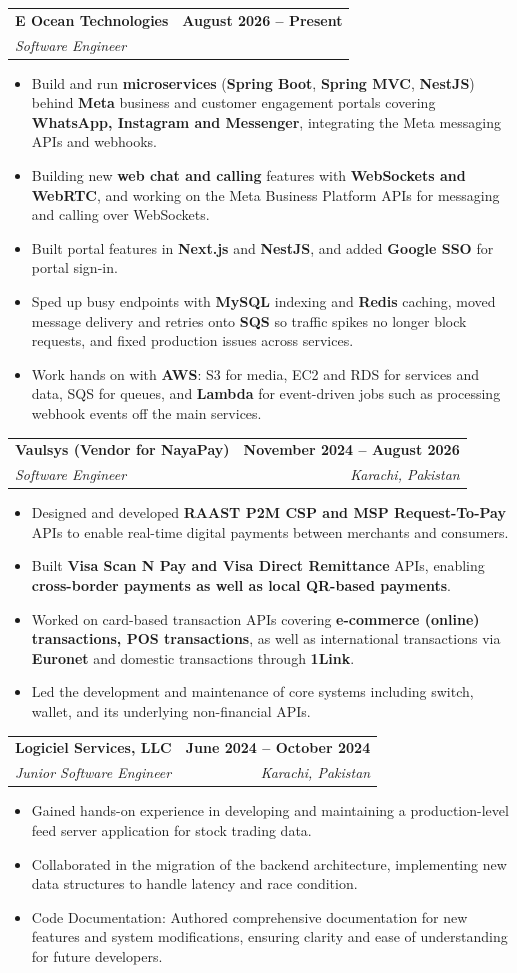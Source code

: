 \documentclass[letterpaper,10pt]{article}
\makeatletter
\newcommand{\resumeItem}[1]{\item\small{#1 \vspace{-2pt}}}
\newcommand{\resumeSubheading}[4]{
  \vspace{-1pt}\item
    \begin{tabular*}{0.97\textwidth}[t]{l@{\extracolsep{\fill}}r}
      \textbf{#1} & \textbf{\small #2} \\
      \textit{\small#3} & \textit{\small #4} \\
    \end{tabular*}\vspace{-5pt}
}
\newcommand{\resumeItemListStart}{\begin{itemize}}
\newcommand{\resumeItemListEnd}{\end{itemize}\vspace{-5pt}}
\makeatother
\begin{document}
    \resumeSubheading
      {E Ocean Technologies}{August 2026 -- Present}
      {Software Engineer}{}
      \resumeItemListStart
        \resumeItem{Build and run \textbf{microservices} (\textbf{Spring Boot}, \textbf{Spring MVC}, \textbf{NestJS}) behind \textbf{Meta} business and customer engagement portals covering \textbf{WhatsApp, Instagram and Messenger}, integrating the Meta messaging APIs and webhooks.}
        \resumeItem{Building new \textbf{web chat and calling} features with \textbf{WebSockets and WebRTC}, and working on the Meta Business Platform APIs for messaging and calling over WebSockets.}
        \resumeItem{Built portal features in \textbf{Next.js} and \textbf{NestJS}, and added \textbf{Google SSO} for portal sign-in.}
        \resumeItem{Sped up busy endpoints with \textbf{MySQL} indexing and \textbf{Redis} caching, moved message delivery and retries onto \textbf{SQS} so traffic spikes no longer block requests, and fixed production issues across services.}
        \resumeItem{Work hands on with \textbf{AWS}: S3 for media, EC2 and RDS for services and data, SQS for queues, and \textbf{Lambda} for event-driven jobs such as processing webhook events off the main services.}
      \resumeItemListEnd

    \resumeSubheading
      {Vaulsys (Vendor for NayaPay)}{November 2024 -- August 2026}
      {Software Engineer}{Karachi, Pakistan}
      \resumeItemListStart
        \resumeItem{Designed and developed \textbf{RAAST P2M CSP and MSP Request-To-Pay} APIs to enable real-time digital payments between merchants and consumers.}
        \resumeItem{Built \textbf{Visa Scan N Pay and Visa Direct Remittance} APIs, enabling \textbf{cross-border payments as well as local QR-based payments}.}
        \resumeItem{Worked on card-based transaction APIs covering \textbf{e-commerce (online) transactions, POS transactions}, as well as international transactions via \textbf{Euronet} and domestic transactions through \textbf{1Link}.}
        \resumeItem{Led the development and maintenance of core systems including switch, wallet, and its underlying non-financial APIs.}
      \resumeItemListEnd

    \resumeSubheading
      {Logiciel Services, LLC}{June 2024 -- October 2024}
      {Junior Software Engineer}{Karachi, Pakistan}
      \resumeItemListStart
        \resumeItem{Gained hands-on experience in developing and maintaining a production-level feed server application for stock trading data.}
        \resumeItem{Collaborated in the migration of the backend architecture, implementing new data structures to handle latency and race condition.}
        \resumeItem{Code Documentation: Authored comprehensive documentation for new features and system modifications, ensuring clarity and ease of understanding for future developers.}
      \resumeItemListEnd
\end{document}
